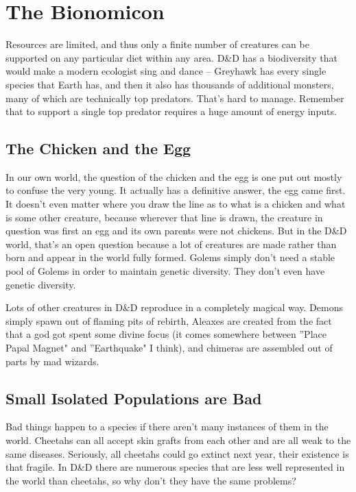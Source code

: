 \section{The Bionomicon} %
\vspace*{-10pt}

Resources are limited, and thus only a finite number of creatures can be supported on any particular diet within any area. D\&D has a biodiversity that would make a modern ecologist sing and dance -- Greyhawk has every single species that Earth has, and then it also has thousands of additional monsters, many of which are technically top predators. That's hard to manage. Remember that to support a single top predator requires a huge amount of energy inputs.

\subsection{The Chicken and the Egg}

In our own world, the question of the chicken and the egg is one put out mostly to confuse the very young. It actually has a definitive answer, the egg came first. It doesn't even matter where you draw the line as to what is a chicken and what is some other creature, because wherever that line is drawn, the creature in question was first an egg and its own parents were not chickens. But in the D\&D world, that's an open question because a lot of creatures are made rather than born and appear in the world fully formed. Golems simply don't need a stable pool of Golems in order to maintain genetic diversity. They don't even have genetic diversity.

Lots of other creatures in D\&D reproduce in a completely magical way. Demons simply spawn out of flaming pits of rebirth, Aleaxes are created from the fact that a god got spent some divine focus (it comes somewhere between ''Place Papal Magnet" and ''Earthquake" I think), and chimeras are assembled out of parts by mad wizards.

\subsection{Small Isolated Populations are Bad}

Bad things happen to a species if there aren't many instances of them in the world. Cheetahs can all accept skin grafts from each other and are all weak to the same diseases. Seriously, all cheetahs could go extinct next year, their existence is that fragile. In D\&D there are numerous species that are less well represented in the world than cheetahs, so why don't they have the same problems?

